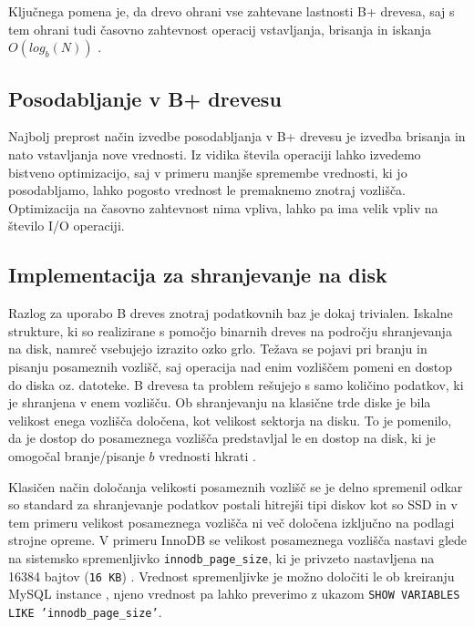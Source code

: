 \documentclass[a4paper,12pt,openright]{book}
\begin{document}
        \noindent
        Ključnega pomena je, da drevo ohrani vse zahtevane lastnosti B+ drevesa, saj s tem ohrani tudi časovno zahtevnost operacij vstavljanja, brisanja in iskanja $O(log_b(N))$ \cite{goodrich2011data}.

        \subsection{Posodabljanje v B+ drevesu}

        Najbolj preprost način izvedbe posodabljanja v B+ drevesu je izvedba brisanja in nato vstavljanja nove vrednosti. Iz vidika števila operaciji lahko izvedemo bistveno optimizacijo, saj v primeru manjše spremembe vrednosti, ki jo posodabljamo, lahko pogosto vrednost le premaknemo znotraj vozlišča. Optimizacija na časovno zahtevnost nima vpliva, lahko pa ima velik vpliv na število I/O operaciji.

        \subsection{Implementacija za shranjevanje na disk}
        Razlog za uporabo B dreves znotraj podatkovnih baz je dokaj trivialen. Iskalne strukture, ki so realizirane s pomočjo binarnih dreves na področju shranjevanja na disk, namreč vsebujejo izrazito ozko grlo. Težava se pojavi pri branju in pisanju posameznih vozlišč, saj operacija nad enim vozliščem pomeni en dostop do diska oz. datoteke. B drevesa ta problem rešujejo s samo količino podatkov, ki je shranjena v enem vozlišču. Ob shranjevanju na klasične trde diske je bila velikost enega vozlišča določena, kot velikost sektorja na disku. To je pomenilo, da je dostop do posameznega vozlišča predstavljal le en dostop na disk, ki je omogočal branje/pisanje $b$ vrednosti hkrati \cite{goodrich2011data}.

        Klasičen način določanja velikosti posameznih vozlišč se je delno spremenil odkar so standard za shranjevanje podatkov postali hitrejši tipi diskov kot so SSD in v tem primeru velikost posameznega vozlišča ni več določena izključno na podlagi strojne opreme. V primeru InnoDB se velikost posameznega vozlišča nastavi glede na sistemsko spremenljivko {\tt innodb\_page\_size}, ki je privzeto nastavljena na \num{16384} bajtov ({\tt 16 KB}) \cite{INOODB_PS}. Vrednost spremenljivke je možno določiti le ob kreiranju MySQL instance \cite{MYSQL_SETUP}, njeno vrednost pa lahko preverimo z ukazom {\tt SHOW VARIABLES LIKE 'innodb\_page\_size'}.
\end{document}
